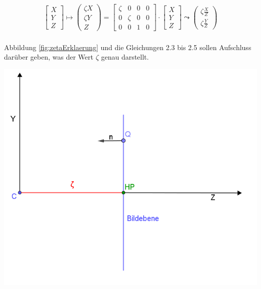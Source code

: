 \begin{gather}
	\begin{bmatrix}
	X\\Y\\Z
	\end{bmatrix} \mapsto
	\begin{pmatrix}
	\zeta X\\ \zeta Y\\ Z
	\end{pmatrix}
	=
	\begin{bmatrix}
	\zeta&0&0&0\\
	0&\zeta&0&0\\
	0&0&1&0
	\end{bmatrix}
	\cdot
	\begin{bmatrix}
	X\\Y\\Z
	\end{bmatrix}
	\leadsto
	\begin{pmatrix}
	\zeta \frac{X}{Z}\\ \zeta \frac{Y}{Z}
	\end{pmatrix}
\end{gather}\\

Abbildung \ref{fig:zetaErklaerung} und die Gleichungen 2.3 bis 2.5 sollen Aufschluss darüber geben, was der Wert $\zeta$ genau darstellt. 

\begin{minipage}{\linewidth}
	\centering
	\includegraphics[width=.8\linewidth]{images/ZetaHerleitung.png}
	\label{fig:zetaErklaerung}
\end{minipage}\\

